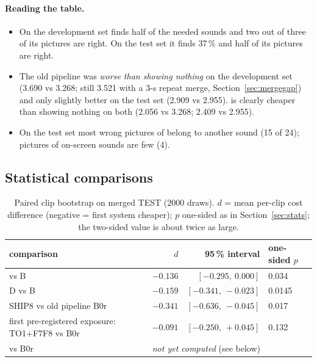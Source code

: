 \paragraph{Reading the table.}
\begin{itemize}
  \item On the development set \Dp{} finds half of the needed sounds and two out of three of its pictures are right.
        On the test set it finds 37\,\% and half of its pictures are right.
  \item The old pipeline was \emph{worse than showing nothing} on the development set (3.690 vs 3.268; still 3.521
        with a 3-s repeat merge, Section~\ref{sec:mergegap}) and only
        slightly better on the test set (2.909 vs 2.955). \Dp{} is clearly cheaper than showing nothing on both
        (2.056 vs 3.268; 2.409 vs 2.955).
  \item On the test set most wrong pictures of \Dp{} belong to another sound (15 of 24); pictures of on-screen sounds
        are few (4).
\end{itemize}

\subsection{Statistical comparisons}\label{sec:statres}
\begin{table}[h]
\centering\small
\caption{Paired clip bootstrap on merged TEST (2000 draws). $d$ = mean per-clip cost difference (negative = first
system cheaper); $p$ one-sided as in Section~\ref{sec:stats}; the two-sided value is about twice as large.}
\label{tab:stats}
\begin{tabular}{lrrl}
\toprule
comparison & $d$ & 95\,\% interval & one-sided $p$ \\
\midrule
\Dp{} vs B & $-0.136$ & $[-0.295,\ 0.000]$ & 0.034 \\
D vs B & $-0.159$ & $[-0.341,\ -0.023]$ & 0.0145 \\
SHIP8 vs old pipeline B0r & $-0.341$ & $[-0.636,\ -0.045]$ & 0.017 \\
first pre-registered exposure: TO1+F7F8 vs B0r & $-0.091$ & $[-0.250,\ +0.045]$ & 0.132 \\
\Dp{} vs B0r & \multicolumn{3}{l}{\emph{not yet computed} (see below)} \\
\bottomrule
\end{tabular}
\end{table}

